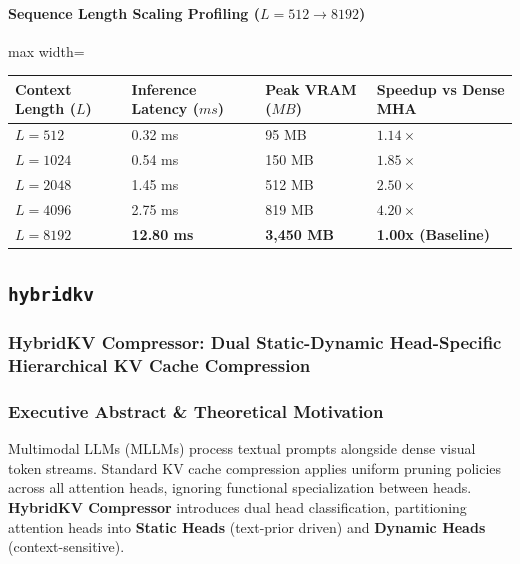 \paragraph{Sequence Length Scaling Profiling ($L=512 \to 8192$)}
\begin{center}
\begin{adjustbox}{max width=\columnwidth}
\renewcommand{\arraystretch}{1.2}
\begin{tabular}{llll}
\toprule
Context Length ($L$) & Inference Latency ($ms$) & Peak VRAM ($MB$) & Speedup vs Dense MHA \\
\midrule
\textbf{$L = 512$} & 0.32 ms & 95 MB & $1.14\times$ \\
\textbf{$L = 1024$} & 0.54 ms & 150 MB & $1.85\times$ \\
\textbf{$L = 2048$} & 1.45 ms & 512 MB & $2.50\times$ \\
\textbf{$L = 4096$} & 2.75 ms & 819 MB & $4.20\times$ \\
\textbf{$L = 8192$} & \textbf{12.80 ms} & \textbf{3,450 MB} & \textbf{1.00x (Baseline)} \\


\bottomrule
\end{tabular}
\end{adjustbox}
\end{center}

\subsection{\texttt{hybridkv}}
\subsubsection*{HybridKV Compressor: Dual Static-Dynamic Head-Specific Hierarchical KV Cache Compression}

\subsubsection*{Executive Abstract \& Theoretical Motivation}

Multimodal LLMs (MLLMs) process textual prompts alongside dense visual token streams. Standard KV cache compression applies uniform pruning policies across all attention heads, ignoring functional specialization between heads. \textbf{HybridKV Compressor} introduces dual head classification, partitioning attention heads into \textbf{Static Heads} (text-prior driven) and \textbf{Dynamic Heads} (context-sensitive).

